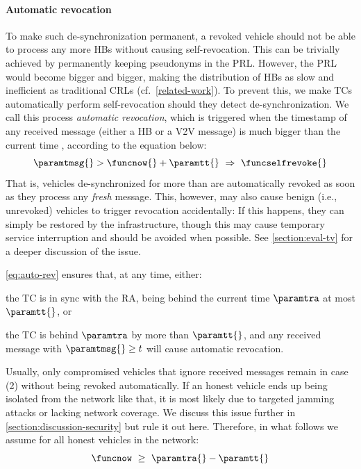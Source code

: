 \paragraph{Automatic revocation}
%
To make such de-synchronization permanent, a revoked vehicle should not be able
to process any more \acp{HB} without causing self-revocation. This can be
trivially achieved by permanently keeping pseudonyms in the \ac{PRL}. However,
the \ac{PRL} would become bigger and bigger, making the distribution of \acp{HB}
as slow and inefficient as traditional \acp{CRL} (cf.~\cref{related-work}). To
prevent this, we make \acp{TC} automatically perform self-revocation should they
detect de-synchronization. We call this process \emph{automatic revocation},
which is triggered when the timestamp \paramtmsg{} of any received message
(either a \ac{HB} or a \ac{V2V} message) is much bigger than the current time
\funcnow, according to the equation below:
%
\begin{equation}
    \label{eq:auto-rev}
    \paramtmsg{} > \funcnow{} + \paramtt{} \ \Rightarrow\  \funcselfrevoke{}
\end{equation}
%
That is, vehicles de-synchronized for more than \paramtt{} are automatically
revoked as soon as they process any \emph{fresh} message. This, however, may
also cause benign (i.e., unrevoked) vehicles to trigger revocation accidentally:
If this happens, they can simply be restored by the infrastructure, though this
may cause temporary service interruption and should be avoided when possible.
See \cref{section:eval-tv} for a deeper discussion of the issue.

\cref{eq:auto-rev} ensures that, at any time, either:
%
\begin{paraenum}
    \item the \ac{TC} is in sync with the \ac{RA}, being behind the current
    time $\paramtra$ at most $\paramtt{}$, or
    \item the \ac{TC} is behind $\paramtra$ by more than $\paramtt{}$, and any
      received message with $\paramtmsg{} \geq t$ will cause automatic
      revocation.
\end{paraenum}
%
Usually, only compromised vehicles that ignore received messages remain in case
(2) without being revoked automatically. If an honest vehicle ends up being
isolated from the network like that, it is most likely due to targeted jamming
attacks or lacking network coverage. We discuss this issue further in
\cref{section:discussion-security} but rule it out here. Therefore, in what
follows we assume for all honest vehicles in the network:
%
\begin{equation}
    \label{eq:honest}
    \funcnow \ \geq\ \paramtra{} - \paramtt{}
\end{equation}

